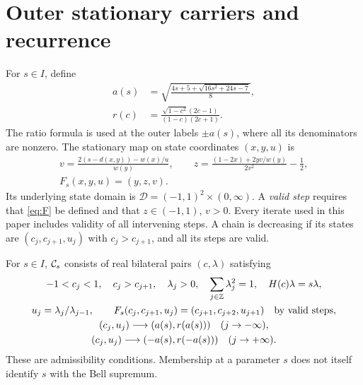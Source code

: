 \section{Outer stationary carriers and recurrence}\label{sec:carriers}
For \(s\in I\), define
\begin{align}
 a(s)&=\sqrt{\frac{4s+5+\sqrt{16s^2+24s-7}}8},\label{eq:a}\\
 r(c)&=\frac{\sqrt{1-c^2}(2c-1)}{(1-c)(2c+1)}.\label{eq:r}
\end{align}
The ratio formula is used at the outer labels \(\pm a(s)\), where all its
denominators are nonzero. The stationary map on state coordinates
\((x,y,u)\) is
\begin{equation}\label{eq:F}
 \begin{gathered}
 v=\frac{2(s-d(x,y))-w(x)/u}{w(y)},\qquad
 z=\frac{(1-2x)+2yv/w(y)}{2v^2}-\frac12,\\
 F_s(x,y,u)=(y,z,v).
 \end{gathered}
\end{equation}
Its underlying state domain is \(\mathcal D=(-1,1)^2\times(0,\infty)\).
A \emph{valid step} requires that \eqref{eq:F} be defined and that
\(z\in(-1,1)\), \(v>0\). Every iterate used in this paper includes validity
of all intervening steps. A chain is decreasing if its states are
\((c_j,c_{j+1},u_j)\) with \(c_j>c_{j+1}\), and all its steps are valid.

\begin{definition}\label{def:carrier}
For \(s\in I\), \(\mathcal C_s\) consists of real bilateral pairs \((c,\lambda)\)
satisfying
\begin{equation}\label{eq:carrierconditions}
\begin{gathered}
 -1<c_j<1,\quad c_j>c_{j+1},\quad \lambda_j>0,\quad
 \sum_{j\in\mathbb Z}\lambda_j^2=1,\quad H(c)\lambda=s\lambda,\\
 u_j=\lambda_j/\lambda_{j-1},\qquad
 F_s(c_j,c_{j+1},u_j)=(c_{j+1},c_{j+2},u_{j+1})
 \quad\hbox{by valid steps},\\
 (c_j,u_j)\longrightarrow(a(s),r(a(s)))\quad(j\to-\infty),\\
 (c_j,u_j)\longrightarrow(-a(s),r(-a(s)))\quad(j\to+\infty).
\end{gathered}
\end{equation}
These are admissibility conditions. Membership at a parameter \(s\) does
not itself identify \(s\) with the Bell supremum.
\end{definition}

